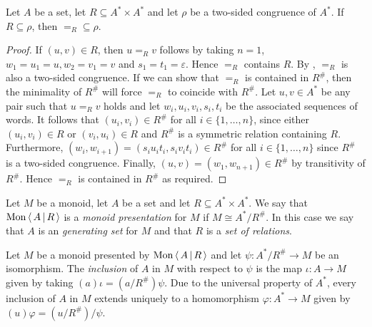 \begin{lemma}\label{lem:equal_mod_R_is_cong_gen_by_R}
	\rocqok{}
	Let $A$ be a set, let $R\subseteq A^\ast \times A^\ast$ and let $\rho$ be a two-sided congruence of $A^\ast$.
	If $R \subseteq \rho$, then $=_R \subseteq \rho$.
\end{lemma}
\begin{proof}
	\rocqok{}
	If $(u, v)\in R$, then $u=_R v$ follows by taking $n = 1$, $w_1 = u_1 = u, w_2 = v_1 = v$ and
	$s_1 = t_1 = \varepsilon$. Hence $=_R$ contains $R$. By , $=_R$ is also a two-sided
	congruence. If we can show that $=_R$ is contained in $R^\#$, then the minimality of $R^\#$ will force $=_R$ to
	coincide with $R^\#$. Let $u, v\in A^\ast$ be any pair such that $u =_R v$ holds and let $w_i, u_i, v_i, s_i, t_i$ be
	the associated sequences of words. It follows that
	$(u_i, v_i)\in R^\#$ for all $i\in\{1,\ldots, n\}$, since either $(u_i, v_i)\in R$ or $(v_i, u_i)\in R$ and
	$R^\#$ is a symmetric relation containing $R$. Furthermore, $(w_i, w_{i+1}) = (s_i u_i t_i, s_i v_i t_i)\in R^\#$ for
	all $i\in \{1, \ldots, n\}$
	since $R^\#$ is a two-sided congruence. Finally, $(u, v) = (w_1, w_{n+1}) \in R^\#$ by transitivity of $R^\#$. Hence
	$=_R$ is contained in $R^\#$ as required.
\end{proof}

\begin{definition}\label{def:monoid_presentation}
	Let $M$ be a monoid, let $A$ be a set and let $R\subseteq A^\ast \times A^\ast$. We say
	that $\mathrm{Mon}\left\langle\, A \,\middle|\, R \,\right\rangle$ is a \emph{monoid presentation} for $M$ if $M \cong A^\ast / R^\#$. In this case we say that
	$A$ is an \emph{generating set} for $M$ and that $R$ is a \emph{set of relations}.
\end{definition}

\begin{definition}\label{def:generating_set_inclusion}
	Let $M$ be a monoid presented by $\mathrm{Mon}\left\langle\, A \,\middle|\, R \,\right\rangle$ and let $\psi: A^\ast/R^\# \rightarrow M$ be an isomorphism.
	The \emph{inclusion} of $A$ in $M$ with respect to $\psi$ is the map $\iota: A \rightarrow M$ given by taking
	$(a)\iota = (a/R^\#)\psi$. Due to the universal property of $A^\ast$, every inclusion of $A$ in $M$ extends uniquely
	to a homomorphism $\varphi: A^\ast\rightarrow M$ given by $(u)\varphi = (u/R^\#)/\psi$.
\end{definition}

